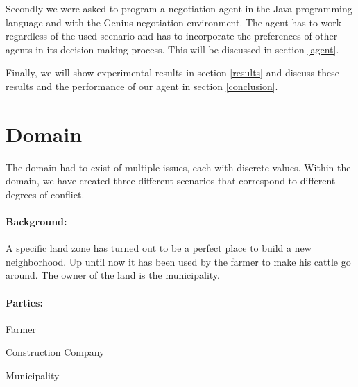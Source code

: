 \documentclass[a4,11pt]{scrartcl}
\let\tempone\itemize
\let\temptwo\enditemize
\renewenvironment{itemize}{\tempone\addtolength{\itemsep}{-0.5\baselineskip}}{\temptwo}
\begin{document}
    Secondly we were asked to program a negotiation agent in the Java 
    programming language and with the {\sc Genius} negotiation 
    environment. The agent has to work regardless of the used scenario 
    and has to incorporate the preferences of other agents in its 
    decision making process. This will be discussed in section 
    \ref{agent}.
    
    Finally, we will show experimental results in section \ref{results}
    and discuss these results and the performance of our agent in
    section \ref{conclusion}.

\newpage

\section{Domain}\label{domain}

    The domain had to exist of multiple issues, each with discrete values.
    Within the domain, we have created three different scenarios that
    correspond to different degrees of conflict.
    
    \paragraph{Background:}
    A specific land zone has turned out to be a perfect place to build 
    a new neighborhood. Up until now it has been used by the farmer to 
    make his cattle go around. The owner of the land is the 
    municipality.

    \paragraph{Parties:}
    \begin{itemize}
        \item Farmer
        \item Construction Company
        \item Municipality
    \end{itemize}
\end{document}
